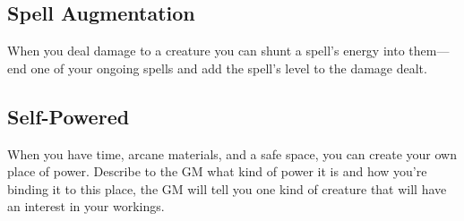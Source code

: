  
\subsection{Spell Augmentation}    
 

When you deal damage to a creature you can shunt a spell's energy into them—end one of your ongoing spells and add the spell's level to the damage dealt.

 
\subsection{Self-Powered}   
 

When you have time, arcane materials, and a safe space, you can create your own place of power. Describe to the GM what kind of power it is and how you're binding it to this place, the GM will tell you one kind of creature that will have an interest in your workings.










